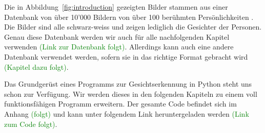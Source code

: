 Die in Abbildung~\ref{fig:introduction} gezeigten Bilder stammen aus einer Datenbank von über 10'000 Bildern von über 100 berühmten Persönlichkeiten \cite{Chen14}.
Die Bilder sind alle schwarz-weiss und zeigen lediglich die Gesichter der Personen.
Genau diese Datenbank werden wir auch für alle nachfolgenden Kapitel verwenden \textcolor{green}{(Link zur Datenbank folgt)}.
Allerdings kann auch eine andere Datenbank verwendet werden, sofern sie in das richtige Format gebracht wird \textcolor{green}{(Kapitel dazu folgt)}.

Das Grundgerüst eines Programms zur Gesichtserkennung in Python steht uns schon zur Verfügung.
Wir werden dieses in den folgenden Kapiteln zu einem voll funktionsfähigen Programm erweitern.
Der gesamte Code befindet sich im Anhang \textcolor{green}{(folgt)} und kann unter folgendem Link heruntergeladen werden \textcolor{green}{(Link zum Code folgt)}.
